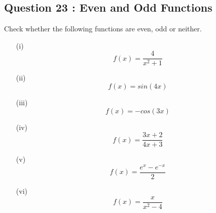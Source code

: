 



\subsection*{Question 23 : Even and Odd Functions}
Check whether the following functions are even, odd or neither.
\begin{multicols}{3}
	\begin{itemize}
		\item[(i)] \[f(x) = \frac{4}{x^2+1}\]
		\item[(ii)] \[f(x) = sin(4x) \]
		\item[(iii)] \[f(x) = -cos(3x) \]
		\item[(iv)] \[f(x) = \frac{3x+2}{4x+3} \]
		\item[(v)] \[f(x) =  \frac{e^{x} - e^{-x}}{2}\]
		\item[(vi)] \[f(x) = \frac{x}{x^2-4} \]
	\end{itemize}
\end{multicols}

